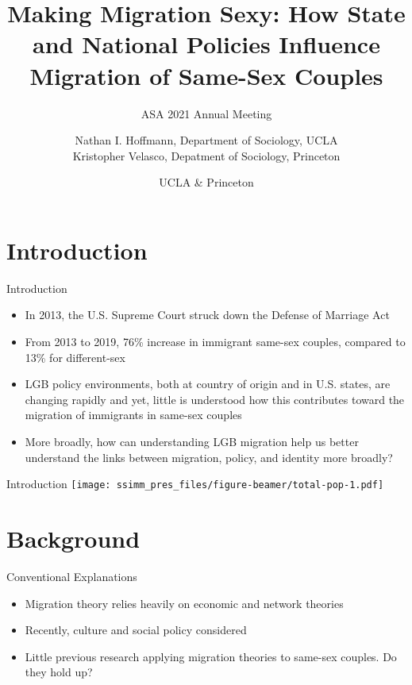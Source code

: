 \documentclass[
  ignorenonframetext,
]{beamer}
\title{Making Migration Sexy: How State and National Policies Influence
Migration of Same-Sex Couples}
\subtitle{ASA 2021 Annual Meeting}
\author{Nathan I. Hoffmann, Department of Sociology, UCLA\\
Kristopher Velasco, Depatment of Sociology, Princeton}
\date{UCLA \& Princeton}
\providecommand{\tightlist}{%
  \setlength{\itemsep}{0pt}\setlength{\parskip}{0pt}}
\begin{document}
\frame{\titlepage}

\hypertarget{introduction}{%
\section{Introduction}\label{introduction}}

\begin{frame}{Introduction}
\protect\hypertarget{introduction-1}{}
\begin{itemize}
\tightlist
\item
  In 2013, the U.S. Supreme Court struck down the Defense of Marriage
  Act
\item
  From 2013 to 2019, 76\% increase in immigrant same-sex couples,
  compared to 13\% for different-sex
\item
  LGB policy environments, both at country of origin and in U.S. states,
  are changing rapidly and yet, little is understood how this
  contributes toward the migration of immigrants in same-sex couples
\item
  More broadly, how can understanding LGB migration help us better
  understand the links between migration, policy, and identity more
  broadly?
\end{itemize}
\end{frame}

\begin{frame}{Introduction}
\protect\hypertarget{introduction-2}{}
\texttt{[image: ssimm\_pres\_files/figure-beamer/total-pop-1.pdf]}
\end{frame}

\hypertarget{background}{%
\section{Background}\label{background}}

\begin{frame}{Conventional Explanations}
\protect\hypertarget{conventional-explanations}{}
\begin{itemize}
\tightlist
\item
  Migration theory relies heavily on economic and network theories
\item
  Recently, culture and social policy considered
\item
  Little previous research applying migration theories to same-sex
  couples. Do they hold up?
\end{itemize}
\end{frame}
\end{document}

